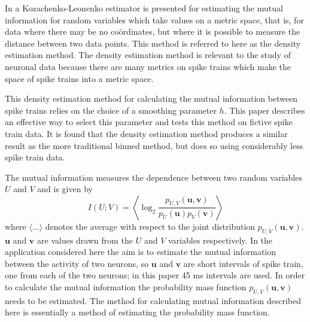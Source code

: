 \documentclass[12pt]{article}
\renewcommand{\u}{\mathbf{u}}
\renewcommand{\v}{\mathbf{v}}
\begin{document}
In \citet{Houghton2015} a Kozachenko-Leonenko estimator
\citep{KozachenkoLeonenko1987,Victor2002,KraskovEtAl2004,TobinHoughton2013}
is presented for estimating the mutual information for random
variables which take values on a metric space, that is, for data where
there may be no co\"{o}rdinates, but where it is possible to measure
the distance between two data points. This method is referred to here
as the density estimation method. The density estimation method is
relevant to the study of neuronal data because there are many metrics
on spike trains
\citep{VictorPurpura1996,vanRossum2001,AronovEtAl2003,HoughtonSen2008,HoughtonVictor2010}
which make the space of spike trains into a metric space.


This density estimation method for calculating the mutual information
between spike trains relies on the choice of a smoothing parameter
$h$. This paper describes an effective way to select this parameter
and tests this method on fictive spike train data. It is found that
the density estimation method produces a similar result as the more
traditional binned method, but does so using considerably less spike
train data.

The mutual information measures the dependence between two random
variables $U$ and $V$ and is given by
\begin{equation}
I(U;V)=\left\langle \log_2{\frac{p_{U,V}(\u,\v)}{p_U(\u)p_V(\v)}}\right\rangle
\end{equation}
where $\langle\ldots\rangle$ denotes the average with respect to the
joint distribution $p_{U,V}(\u,\v)$. $\u$ and $\v$ are values drawn
from the $U$ and $V$ variables respectively.  In the application
considered here the aim is to estimate the mutual information between
the activity of two neurons, so $\u$ and $\v$ are short intervals of
spike train, one from each of the two neurons; in this paper 45 ms
intervals are used. In order to calculate the mutual information the
probability mass function $p_{U,V}(\u,\v)$ needs to be estimated. The
method for calculating mutual information described here is
essentially a method of estimating the probability mass function.
\end{document}

